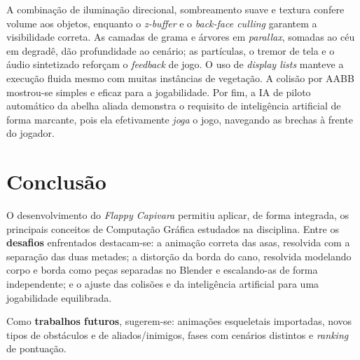 \documentclass[12pt]{article}
\begin{document}
A combinação de iluminação direcional, sombreamento suave e textura confere
volume aos objetos, enquanto o \emph{z-buffer} e o \emph{back-face culling}
garantem a visibilidade correta. As camadas de grama e árvores em
\emph{parallax}, somadas ao céu em degradê, dão profundidade ao cenário; as
partículas, o tremor de tela e o áudio sintetizado reforçam o
\emph{feedback} de jogo. O uso de \emph{display lists} manteve a execução
fluida mesmo com muitas instâncias de vegetação. A colisão por AABB
mostrou-se simples e eficaz para a jogabilidade. Por fim, a IA de piloto
automático da abelha aliada demonstra o requisito de inteligência artificial
de forma marcante, pois ela efetivamente \emph{joga} o jogo, navegando as
brechas à frente do jogador.

\section{Conclusão}

O desenvolvimento do \emph{Flappy Capivara} permitiu aplicar, de forma
integrada, os principais conceitos de Computação Gráfica estudados na
disciplina. Entre os \textbf{desafios} enfrentados destacam-se: a animação
correta das asas, resolvida com a separação das duas metades; a distorção da
borda do cano, resolvida modelando corpo e borda como peças separadas no
Blender e escalando-as de forma independente; e o ajuste das colisões e da
inteligência artificial para uma jogabilidade equilibrada.

Como \textbf{trabalhos futuros}, sugerem-se: animações esqueletais
importadas, novos tipos de obstáculos e de aliados/inimigos, fases com
cenários distintos e \emph{ranking} de pontuação.

\end{document}
